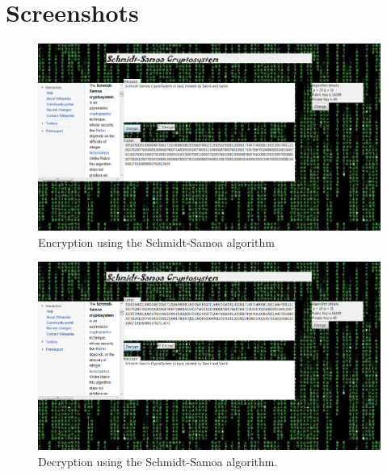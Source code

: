 \documentclass[12pt]{article} %
\begin{document}
\section{Screenshots}
\begin{figure}[h!]
  \centering
   \includegraphics[scale=0.50]{encrypt.png}
  \caption{Encryption using the Schmidt-Samoa algorithm}
\end{figure}

\begin{figure}[h!]
  \centering
   \includegraphics[scale=0.50]{decrypt.png}
  \caption{Decryption using the Schmidt-Samoa algorithm.}
\end{figure}
\end{document}
